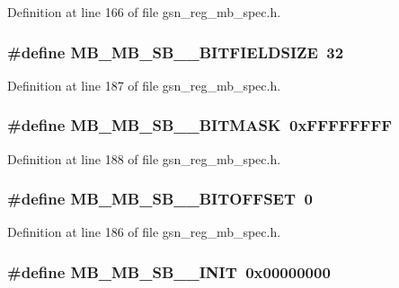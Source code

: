 Definition at line 166 of file gsn\_\-reg\_\-mb\_\-spec.h.

\hypertarget{a00562_a7f58d22bc6bd935cdcebfd551e41276a}{
\subsubsection[{MB\_\-MB\_\-SB\_\-1\_\-BITFIELDSIZE}]{\setlength{\rightskip}{0pt plus 5cm}\#define MB\_\-MB\_\-SB\_\_\-BITFIELDSIZE~32}}
\label{a00562_a7f58d22bc6bd935cdcebfd551e41276a}


Definition at line 187 of file gsn\_\-reg\_\-mb\_\-spec.h.

\hypertarget{a00562_a3e049ae85217296243804dcc0087ee56}{
\subsubsection[{MB\_\-MB\_\-SB\_\-1\_\-BITMASK}]{\setlength{\rightskip}{0pt plus 5cm}\#define MB\_\-MB\_\-SB\_\_\-BITMASK~0xFFFFFFFF}}
\label{a00562_a3e049ae85217296243804dcc0087ee56}


Definition at line 188 of file gsn\_\-reg\_\-mb\_\-spec.h.

\hypertarget{a00562_a4b5f15c244f60225e71245897544e510}{
\subsubsection[{MB\_\-MB\_\-SB\_\-1\_\-BITOFFSET}]{\setlength{\rightskip}{0pt plus 5cm}\#define MB\_\-MB\_\-SB\_\_\-BITOFFSET~0}}
\label{a00562_a4b5f15c244f60225e71245897544e510}


Definition at line 186 of file gsn\_\-reg\_\-mb\_\-spec.h.

\hypertarget{a00562_ab825c64ca597307580f667d0280e7492}{
\subsubsection[{MB\_\-MB\_\-SB\_\-1\_\-INIT}]{\setlength{\rightskip}{0pt plus 5cm}\#define MB\_\-MB\_\-SB\_\_\-INIT~0x00000000}}
\label{a00562_ab825c64ca597307580f667d0280e7492}


